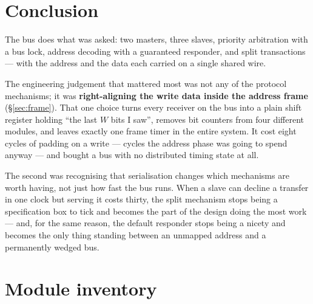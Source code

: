 \documentclass[11pt,a4paper]{article}
\begin{document}
\section{Conclusion}

The bus does what was asked: two masters, three slaves, priority arbitration
with a bus lock, address decoding with a guaranteed responder, and split
transactions --- with the address and the data each carried on a single
shared wire.

The engineering judgement that mattered most was not any of the protocol
mechanisms; it was \textbf{right-aligning the write data inside the address
frame} (\S\ref{sec:frame}). That one choice turns every receiver on the bus
into a plain shift register holding ``the last $W$ bits I saw'', removes bit
counters from four different modules, and leaves exactly one frame timer in
the entire system. It cost eight cycles of padding on a write --- cycles the
address phase was going to spend anyway --- and bought a bus with no
distributed timing state at all.

The second was recognising that serialisation changes which mechanisms are
worth having, not just how fast the bus runs. When a slave can decline a
transfer in one clock but serving it costs thirty, the split mechanism stops
being a specification box to tick and becomes the part of the design doing
the most work --- and, for the same reason, the default responder stops being
a nicety and becomes the only thing standing between an unmapped address and
a permanently wedged bus.

\appendix
\section{Module inventory}
\end{document}
